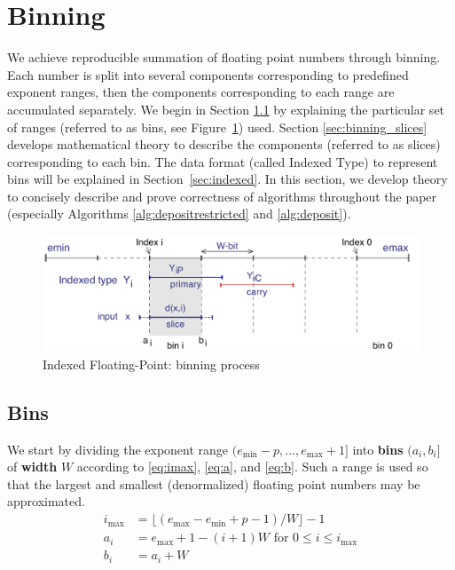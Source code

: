 \section{Binning}
\label{sec:binning}
We achieve reproducible summation of floating point numbers through binning.
Each number is split into several components corresponding to predefined
exponent ranges, then the components corresponding to each range are
accumulated separately. We begin in Section \ref{sec:binning_bins} by
explaining the particular set of ranges (referred to as bins, see Figure~\ref{fig:binning}) used.
Section \ref{sec:binning_slices} develops mathematical theory to describe the
components (referred to as slices) corresponding to each bin.
The data format (called Indexed Type) to represent bins will be
explained in Section~\ref{sec:indexed}.
In this section, we develop 
theory to concisely describe and prove correctness of algorithms throughout the
paper (especially Algorithms \ref{alg:depositrestricted} and \ref{alg:deposit}).

\begin{figure}[H]
\begin{center}
\caption{Indexed Floating-Point: binning process}
\includegraphics[width=\textwidth]{plots/indexedFP}
\end{center}
\label{fig:binning}
\end{figure}


    \subsection{Bins}
    \label{sec:binning_bins}
    We start by dividing the exponent range $(e_{\min} - p, ..., e_{\max} + 1]$
    into \textbf{bins} $(a_i, b_i]$ of \textbf{width} $W$ according to
    \eqref{eq:imax}, \eqref{eq:a}, and \eqref{eq:b}. Such a range is used so
    that the largest and smallest (denormalized) floating point numbers may be
    approximated.
    \begin{align}
        i_{\max} & = \bigl\lfloor(e_{\max} - e_{\min} + p - 1)/W\bigr\rfloor - 1
            \label{eq:imax} \\
        a_i & = e_{\max} + 1 - (i + 1)W \text{ for } 0 \leq i \leq i_{\max}
            \label{eq:a} \\
        b_i & = a_i + W
            \label{eq:b}
    \end{align}

